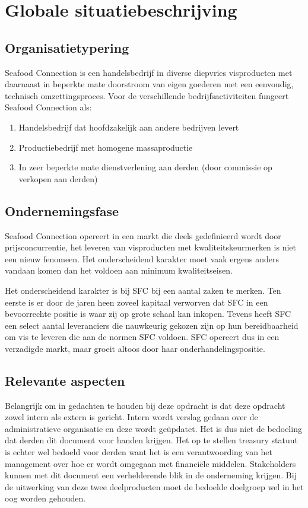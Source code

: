 \documentclass[10pt,a4paper,twoside]{report}
\begin{document}
\chapter{Globale situatiebeschrijving}
\section{Organisatietypering}
Seafood Connection is een handelsbedrijf in diverse diepvries visproducten met daarnaast in beperkte mate doorstroom van eigen goederen met een eenvoudig, technisch omzettingsproces. 
Voor de verschillende bedrijfsactiviteiten fungeert Seafood Connection als:

\begin{enumerate}
    \item Handelsbedrijf dat hoofdzakelijk aan andere bedrijven levert
    \item Productiebedrijf met homogene massaproductie
    \item In zeer beperkte mate dienstverlening aan derden (door commissie op verkopen aan derden)
\end{enumerate}
\citep{aoibsfc}

\section{Ondernemingsfase}
Seafood Connection opereert in een markt die deels gedefinieerd wordt door prijsconcurrentie, het leveren van visproducten met kwaliteitskeurmerken is niet een nieuw fenomeen. Het onderscheidend karakter moet vaak ergens anders vandaan komen dan het voldoen aan minimum kwaliteitseisen. 

Het onderscheidend karakter is bij SFC bij een aantal zaken te merken. Ten eerste is er door de jaren heen zoveel kapitaal verworven dat SFC in een bevoorrechte positie is waar zij op grote schaal kan inkopen. Tevens heeft SFC een select aantal leveranciers die nauwkeurig gekozen zijn op hun bereidbaarheid om vis te leveren die aan de normen SFC voldoen. SFC opereert dus in een verzadigde markt, maar groeit altoos door haar onderhandelingspositie.

\section{Relevante aspecten}
Belangrijk om in gedachten te houden bij deze opdracht is dat deze opdracht zowel intern als extern is gericht. Intern wordt verslag gedaan over de administratieve organisatie en deze wordt geüpdatet. Het is dus niet de bedoeling dat derden dit document voor handen krijgen. Het op te stellen treasury statuut is echter wel bedoeld voor derden want het is een verantwoording van het management over hoe er wordt omgegaan met financiële middelen. Stakeholders kunnen met dit document een verhelderende blik in de onderneming krijgen. Bij de uitwerking van deze twee deelproducten moet de bedoelde doelgroep wel in het oog worden gehouden.
\end{document}
